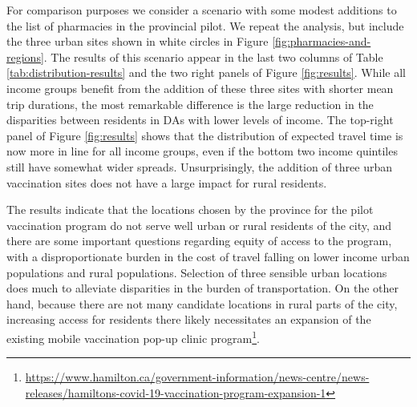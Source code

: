 \documentclass[]{elsarticle} %
\begin{document}
For comparison purposes we consider a scenario with some modest
additions to the list of pharmacies in the provincial pilot. We repeat
the analysis, but include the three urban sites shown in white circles
in Figure \ref{fig:pharmacies-and-regions}. The results of this scenario
appear in the last two columns of Table \ref{tab:distribution-results}
and the two right panels of Figure \ref{fig:results}. While all income
groups benefit from the addition of these three sites with shorter mean
trip durations, the most remarkable difference is the large reduction in
the disparities between residents in DAs with lower levels of income.
The top-right panel of Figure \ref{fig:results} shows that the
distribution of expected travel time is now more in line for all income
groups, even if the bottom two income quintiles still have somewhat
wider spreads. Unsurprisingly, the addition of three urban vaccination
sites does not have a large impact for rural residents.

The results indicate that the locations chosen by the province for the
pilot vaccination program do not serve well urban or rural residents of
the city, and there are some important questions regarding equity of
access to the program, with a disproportionate burden in the cost of
travel falling on lower income urban populations and rural populations.
Selection of three sensible urban locations does much to alleviate
disparities in the burden of transportation. On the other hand, because
there are not many candidate locations in rural parts of the city,
increasing access for residents there likely necessitates an expansion
of the existing mobile vaccination pop-up clinic
program\footnote{\url{https://www.hamilton.ca/government-information/news-centre/news-releases/hamiltons-covid-19-vaccination-program-expansion-1}}.
\end{document}
